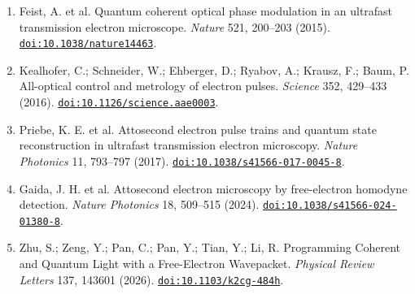 {\begin{enumerate}
\item {}\label{ch02-ref1}Feist, A. et al. Quantum coherent optical phase modulation in an ultrafast transmission electron microscope. \emph{Nature} 521, 200--203 (2015). \href{https://doi.org/10.1038/nature14463}{\nolinkurl{doi:10.1038/nature14463}}.
\item {}\label{ch02-ref2}Kealhofer, C.; Schneider, W.; Ehberger, D.; Ryabov, A.; Krausz, F.; Baum, P. All-optical control and metrology of electron pulses. \emph{Science} 352, 429--433 (2016). \href{https://doi.org/10.1126/science.aae0003}{\nolinkurl{doi:10.1126/science.aae0003}}.
\item {}\label{ch02-ref3}Priebe, K. E. et al. Attosecond electron pulse trains and quantum state reconstruction in ultrafast transmission electron microscopy. \emph{Nature Photonics} 11, 793--797 (2017). \href{https://doi.org/10.1038/s41566-017-0045-8}{\nolinkurl{doi:10.1038/s41566-017-0045-8}}.
\item {}\label{ch02-ref4}Gaida, J. H. et al. Attosecond electron microscopy by free-electron homodyne detection. \emph{Nature Photonics} 18, 509--515 (2024). \href{https://doi.org/10.1038/s41566-024-01380-8}{\nolinkurl{doi:10.1038/s41566-024-01380-8}}.
\item {}\label{ch02-ref5}Zhu, S.; Zeng, Y.; Pan, C.; Pan, Y.; Tian, Y.; Li, R. Programming Coherent and Quantum Light with a Free-Electron Wavepacket. \emph{Physical Review Letters} 137, 143601 (2026). \href{https://doi.org/10.1103/k2cg-484h}{\nolinkurl{doi:10.1103/k2cg-484h}}.
\end{enumerate}
}
